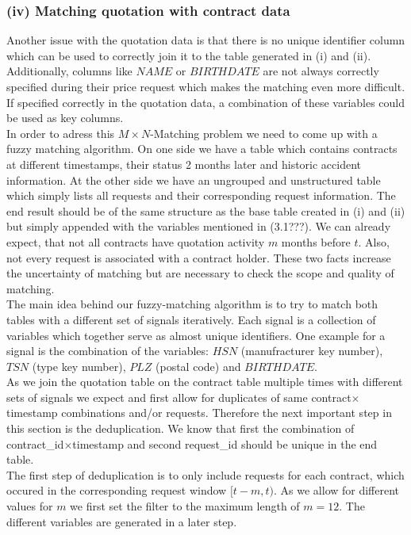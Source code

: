 \documentclass[12pt,titlepage]{article}
\begin{document}
\subsubsection*{(iv) Matching quotation with contract data}
Another issue with the quotation data is that there is no unique identifier column which can be used to correctly join it to the table generated in (i) and (ii). Additionally, columns like $NAME$ or $BIRTHDATE$ are not always correctly specified during their price request which makes the matching even more difficult. If specified correctly in the quotation data, a combination of these variables could be used as key columns. \\
In order to adress this $M\times N$-Matching problem we need to come up with a fuzzy matching algorithm. On one side we have a table which contains contracts at different timestamps, their status 2 months later and historic accident information. At the other side we have an ungrouped and unstructured table which simply lists all requests and their corresponding request information. The end result should be of the same structure as the base table created in (i) and (ii) but simply appended with the variables mentioned in (3.1???). We can already expect, that not all contracts have quotation activity $m$ months before $t$. Also, not every request is associated with a contract holder. These two facts increase the uncertainty of matching but are necessary to check the scope and quality of matching. \\
The main idea behind our fuzzy-matching algorithm is to try to match both tables with a different set of signals iteratively. Each signal is a collection of variables which together serve as almost unique identifiers. One example for a signal is the combination of the variables: $HSN$ (manufracturer key number), $TSN$ (type key number), $PLZ$ (postal code) and $BIRTHDATE$. \\
As we join the quotation table on the contract table multiple times with different sets of signals we expect and first allow for duplicates of same contract$\times$timestamp combinations and/or requests. Therefore the next important step in this section is the deduplication. We know that first the combination of contract\_id$\times$timestamp and second request\_id should be unique in the end table. \\
The first step of deduplication is to only include requests for each contract, which occured in the corresponding request window $[t-m,t)$. As we allow for different values for $m$ we first set the filter to the maximum length of $m=12$. The different variables are generated in a later step. \\
\end{document}
